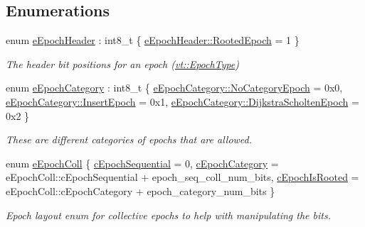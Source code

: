 \subsection*{Enumerations}
\begin{DoxyCompactItemize}
\item 
enum \hyperlink{namespacevt_1_1epoch_a8cbcd2bf5d3ce987837869c26a1d00ad}{e\+Epoch\+Header} \+: int8\+\_\+t \{ \hyperlink{namespacevt_1_1epoch_a8cbcd2bf5d3ce987837869c26a1d00ada4bbf8ef3641b58f81dc5320f32df0178}{e\+Epoch\+Header\+::\+Rooted\+Epoch} = 1
 \}\begin{DoxyCompactList}\small\item\em The header bit positions for an epoch ({\ttfamily \hyperlink{namespacevt_a985a5adf291c34a3ca263b3378388236}{vt\+::\+Epoch\+Type}}) \end{DoxyCompactList}
\item 
enum \hyperlink{namespacevt_1_1epoch_a956abe0aceef0d10a988de8acb002c7c}{e\+Epoch\+Category} \+: int8\+\_\+t \{ \hyperlink{namespacevt_1_1epoch_a956abe0aceef0d10a988de8acb002c7caa6136714a068313660a40ae6bd15410c}{e\+Epoch\+Category\+::\+No\+Category\+Epoch} = 0x0, 
\hyperlink{namespacevt_1_1epoch_a956abe0aceef0d10a988de8acb002c7cae357e225fcb0ad22e8152c68f4d9829f}{e\+Epoch\+Category\+::\+Insert\+Epoch} = 0x1, 
\hyperlink{namespacevt_1_1epoch_a956abe0aceef0d10a988de8acb002c7ca317c96e0b9f3b6871d4832a7f9e31e9f}{e\+Epoch\+Category\+::\+Dijkstra\+Scholten\+Epoch} = 0x2
 \}\begin{DoxyCompactList}\small\item\em These are different categories of epochs that are allowed. \end{DoxyCompactList}
\item 
enum \hyperlink{namespacevt_1_1epoch_aff6d7581e1d2888909564a5deaaf11a9}{e\+Epoch\+Coll} \{ \hyperlink{namespacevt_1_1epoch_aff6d7581e1d2888909564a5deaaf11a9abbdc913c0a12f5a5617e1146a11f5fb5}{c\+Epoch\+Sequential} = 0, 
\hyperlink{namespacevt_1_1epoch_aff6d7581e1d2888909564a5deaaf11a9ac42416b5e5a9257c76fb7a691c7d79be}{c\+Epoch\+Category} = e\+Epoch\+Coll\+:\+:c\+Epoch\+Sequential + epoch\+\_\+seq\+\_\+coll\+\_\+num\+\_\+bits, 
\hyperlink{namespacevt_1_1epoch_aff6d7581e1d2888909564a5deaaf11a9a87c678c589ab0fbaf738353c3d9ea9d5}{c\+Epoch\+Is\+Rooted} = e\+Epoch\+Coll\+:\+:c\+Epoch\+Category + epoch\+\_\+category\+\_\+num\+\_\+bits
 \}\begin{DoxyCompactList}\small\item\em Epoch layout enum for collective epochs to help with manipulating the bits. \end{DoxyCompactList}

\end{DoxyCompactItemize}
